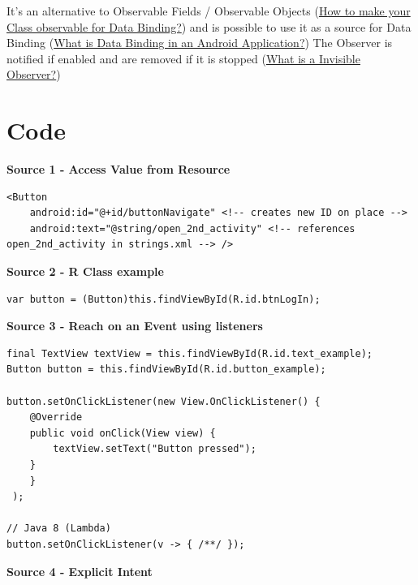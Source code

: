 \documentclass[11pt,twoside,landscape]{article}
\begin{document}
\begin{multicols}{3}
It's an alternative to Observable Fields / Observable Objects (\href{../../../roam/20211112103257-how_to_make_your_class_observable_for_data_binding.org}{How to make your Class observable for Data Binding?}) and is possible to use it as a source for Data Binding (\href{../../../roam/20211112100504-what_is_data_binding_in_an_android_application.org}{What is Data Binding in an Android Application?})
The Observer is notified if enabled and are removed if it is stopped (\href{../../../roam/20211112110032-what_is_a_invisible_observer.org}{What is a Invisible Observer?})
\end{multicols}

\section{Code}
\label{sec:org1dfbb86}
\textbf{Source 1 - Access Value from Resource}

\lstset{language=XML,label= ,caption= ,captionpos=b,numbers=none}
\begin{lstlisting}
<Button
    android:id="@+id/buttonNavigate" <!-- creates new ID on place -->
    android:text="@string/open_2nd_activity" <!-- references open_2nd_activity in strings.xml --> />
\end{lstlisting}

\textbf{Source 2 - R Class example}

\lstset{language=java,label= ,caption= ,captionpos=b,numbers=none}
\begin{lstlisting}
var button = (Button)this.findViewById(R.id.btnLogIn);
\end{lstlisting}

\textbf{Source 3 - Reach on an Event using listeners}

\lstset{language=java,label= ,caption= ,captionpos=b,numbers=none}
\begin{lstlisting}
final TextView textView = this.findViewById(R.id.text_example);
Button button = this.findViewById(R.id.button_example);

button.setOnClickListener(new View.OnClickListener() {
	@Override
	public void onClick(View view) {
	    textView.setText("Button pressed");
	}
    }
 );

// Java 8 (Lambda)
button.setOnClickListener(v -> { /**/ });
\end{lstlisting}

\textbf{Source 4 - Explicit Intent}
\end{document}
